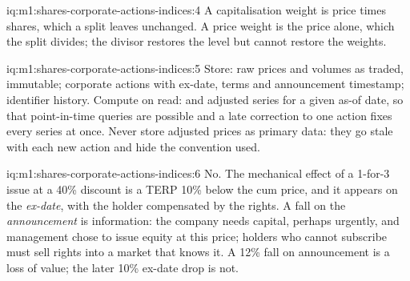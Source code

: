 \begin{solution}{iq:m1:shares-corporate-actions-indices:4}
A capitalisation weight is price times shares, which a split leaves
unchanged. A price weight is the price alone, which the split divides; the
divisor restores the level but cannot restore the weights.
\end{solution}

\begin{solution}{iq:m1:shares-corporate-actions-indices:5}
Store: raw prices and volumes as traded, immutable; corporate actions with
ex-date, terms and announcement timestamp; identifier history. Compute on
read:  and adjusted series for a given as-of date, so that
point-in-time queries are possible and a late correction to one action fixes
every series at once. Never store adjusted prices as primary data: they go
stale with each new action and hide the convention used.
\end{solution}

\begin{solution}{iq:m1:shares-corporate-actions-indices:6}
No. The mechanical effect of a 1-for-3 issue at a 40\% discount is a TERP
10\% below the cum price, and it appears on the \emph{ex-date}, with the
holder compensated by the rights. A fall on the \emph{announcement} is
information: the company needs capital, perhaps urgently, and management
chose to issue equity at this price; holders who cannot subscribe must sell
rights into a market that knows it. A 12\% fall on announcement is a loss of
value; the later 10\% ex-date drop is not.
\end{solution}
